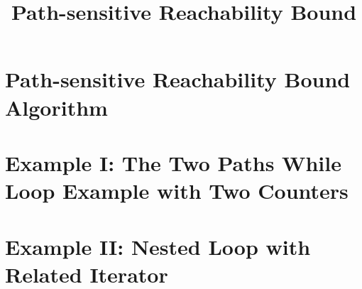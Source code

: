 \documentclass[a4paper,11pt]{article}
\begin{document}
\title{Path-sensitive Reachability Bound}

\author{}

\date{}

\maketitle
%
% 
\section{Path-sensitive Reachability Bound Algorithm}
\label{sec:static_rb}

\section{Example I: The Two Paths While Loop Example with Two Counters}

\section{Example II: Nested Loop with Related Iterator}

%


\clearpage


\end{document}
